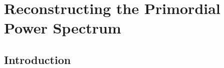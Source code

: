 \chapter{Reconstructing the Primordial Power Spectrum}
\label{chap:rec}

\section{Introduction}
\label{sec:rec:intro}
